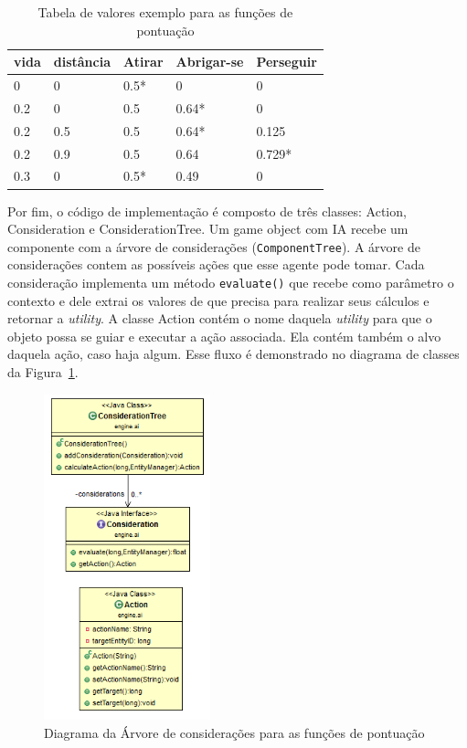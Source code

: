 \documentclass[12pt, 
openright, 
oneside, 
a4paper,    
brazil]{facom-ufu-abntex2}
\begin{document}
 
\begin{table}[H]
\centering
\begin{tabular}{l l l l l}
vida & distância & Atirar & Abrigar-se & Perseguir \\
\hline		
0 & 0 & 0.5* & 0 & 0 \\
0.2 & 0 & 0.5 & 0.64* & 0 \\
0.2 & 0.5 & 0.5 & 0.64* & 0.125 \\
0.2 & 0.9 & 0.5 & 0.64 & 0.729* \\
0.3 & 0 & 0.5* & 0.49 & 0 \\

\end{tabular}
\caption{Tabela de valores exemplo para as funções de pontuação}
\label{table:utilityExample}
\end{table}

Por fim, o código de implementação é composto de três classes: Action, Consideration e ConsiderationTree. Um game object com IA recebe um componente com a árvore de considerações (\texttt{ComponentTree}). A árvore de considerações contem as possíveis ações que esse agente pode tomar. Cada consideração implementa um método \texttt{evaluate()} que recebe como parâmetro o contexto e dele extrai os valores de que precisa para realizar seus cálculos e retornar a \textit{utility}. A classe Action contém o nome daquela \textit{utility} para que o objeto possa se guiar e executar a ação associada. Ela contém também o alvo daquela ação, caso haja algum. Esse fluxo é demonstrado no diagrama de classes da Figura~\ref{fig:considerationTree}.

\begin{figure}[H]
	\centering
	\includegraphics[width=13em]{imagens/considerationTree.png}
	\caption{Diagrama da Árvore de considerações para as funções de pontuação}
	\label{fig:considerationTree}
\end{figure}
\end{document}
